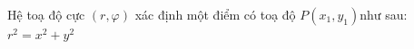 \documentclass[preview]{standalone}
\begin{document}
\begin{center}
Hệ toạ độ cực $(r,\varphi)$ xác định một điểm có toạ độ $P(x_1, y_1)$như sau:$r^2=x^2+y^2$
\end{center}
\end{document}
